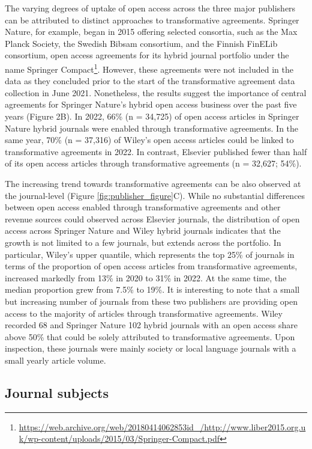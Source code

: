 \documentclass[a4paper,man,floatsintext,longtable,noextraspace,12pt]{apa6}
\begin{document}
The varying degrees of uptake of open access across the three major
publishers can be attributed to distinct approaches to transformative
agreements. Springer Nature, for example, began in 2015 offering
selected consortia, such as the Max Planck Society, the Swedish Bibsam
consortium, and the Finnish FinELib consortium, open access agreements
for its hybrid journal portfolio under the name Springer
Compact\footnote{\url{https://web.archive.org/web/20180414062853id_/http://www.liber2015.org.uk/wp-content/uploads/2015/03/Springer-Compact.pdf}}.
However, these agreements were not included in the data as they
concluded prior to the start of the transformative agreement data
collection in June 2021. Nonetheless, the results suggest the importance
of central agreements for Springer Nature's hybrid open access business
over the past five years (Figure 2B). In 2022, 66\% (n = 34,725) of open
access articles in Springer Nature hybrid journals were enabled through
transformative agreements. In the same year, 70\% (n = 37,316) of
Wiley's open access articles could be linked to transformative
agreements in 2022. In contrast, Elsevier published fewer than half of
its open access articles through transformative agreements (n = 32,627;
54\%).

The increasing trend towards transformative agreements can be also
observed at the journal-level (Figure \ref{fig:publisher_figure}C).
While no substantial differences between open access enabled through
transformative agreements and other revenue sources could observed
across Elsevier journals, the distribution of open access across
Springer Nature and Wiley hybrid journals indicates that the growth is
not limited to a few journals, but extends across the portfolio. In
particular, Wiley's upper quantile, which represents the top 25\% of
journals in terms of the proportion of open access articles from
transformative agreements, increased markedly from 13\% in 2020 to 31\%
in 2022. At the same time, the median proportion grew from 7.5\% to
19\%. It is interesting to note that a small but increasing number of
journals from these two publishers are providing open access to the
majority of articles through transformative agreements. Wiley recorded
68 and Springer Nature 102 hybrid journals with an open access share
above 50\% that could be solely attributed to transformative agreements.
Upon inspection, these journals were mainly society or local language
journals with a small yearly article volume.

\hypertarget{journal-subjects}{%
\subsection{Journal subjects}\label{journal-subjects}}
\end{document}

